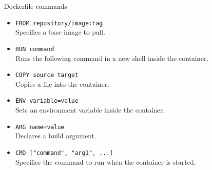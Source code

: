 \begin{frame}{Dockerfile commands}
	\begin{itemize}
		\item \texttt{FROM repository/image:tag}\\Specifies a base image to pull.
		\item \texttt{RUN command}\\Runs the following command in a new shell inside the container.
		\item \texttt{COPY source target}\\Copies a file into the container.
		\item \texttt{ENV variable=value}\\Sets an environment variable inside the container.
		\item \texttt{ARG name=value}\\Declares a build argument.
		\item \texttt{CMD ["command", "arg1", ...]}\\Specifies the command to run when the container is started.
	\end{itemize}
\end{frame}

